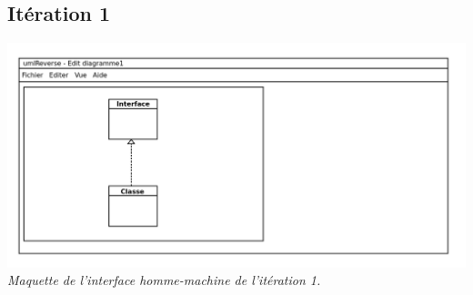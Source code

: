 \documentclass[hidelinks, 10pt,a4paper]{article}
\begin{document}

\subsection{Itération 1}
\begin{center}
  \includegraphics[width=\textwidth]{imgPDD/ihm_it1.png}
\textit{Maquette de l'interface homme-machine de l'itération 1.}
\end{center}
\end{document}
